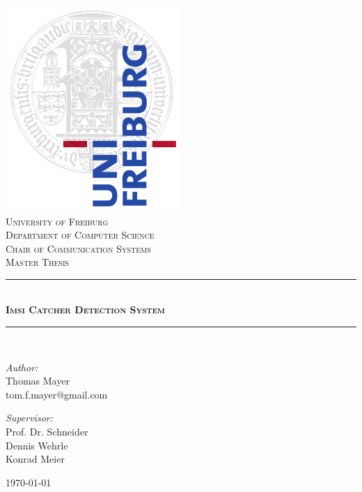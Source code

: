 
\begin{fullsizetitle}
	\thispagestyle{empty}
	\begin{center}
		\vspace{1.5cm}
		\includegraphics[width=0.5\textwidth]{../Images/unisiegel}\\[1cm]

		\textsc{\LARGE University of Freiburg}\\[0.5cm]
		\textsc{Department of Computer Science\\Chair of Communication Systems}\\[2cm]
		\textsc{\LARGE Master Thesis}\\[0.5cm]

		\rule{0.7\linewidth}{0.5mm} \\[0.7cm]
		\textsc{\huge \bfseries Imsi Catcher Detection System}\\[0.4cm]
		\rule{0.7\linewidth}{0.5mm} \\[1.5cm]

		\begin{minipage}{0.4\textwidth}
			\begin{flushleft} \large
				\emph{Author:}\\
				Thomas Mayer\\
				tom.f.mayer@gmail.com
			\end{flushleft}
		\end{minipage}
		\begin{minipage}{0.4\textwidth}
			\begin{flushright} \large
				\emph{Supervisor:} \\
				Prof. Dr. Schneider\\
				Dennis Wehrle\\
				Konrad Meier
			\end{flushright}
		\end{minipage}

		\vfill
		{\large \today}
	\end{center}
\end{fullsizetitle}
